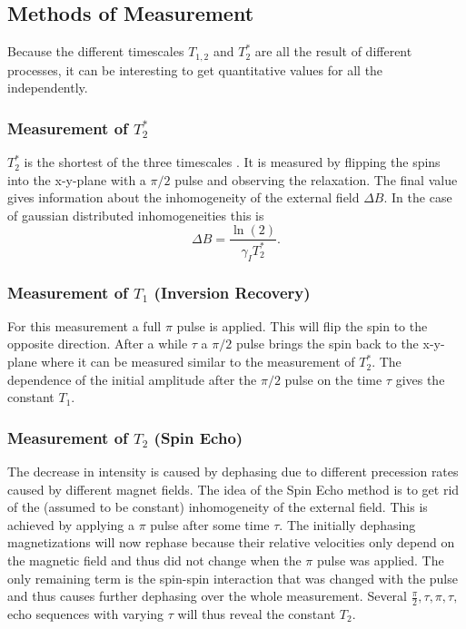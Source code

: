 \documentclass[a4paper]{scrartcl}
\numberwithin{equation}{section}
\numberwithin{figure}{section}
\numberwithin{table}{section}
\newcommand{\eq}[2]{\begin{equation}#1\label{#2}\end{equation}}
\begin{document}
\subsection{Methods of Measurement}
\label{sec:methods}
Because the different timescales $T_{1,2}$ and $T_2^*$ are all the result of different processes, it can be interesting to get quantitative values for all the independently.

\subsubsection*{Measurement of $T_2^*$}
$T_2^*$ is the shortest of the three timescales \cite{skript}. It is measured by flipping the spins into the x-y-plane with a $\pi/2$ pulse and observing the relaxation. The final value gives information about the inhomogeneity of the external field ${\Delta B}$. In the case of gaussian distributed inhomogeneities this is
\eq{{\Delta B} = \frac{\ln(2)}{\gamma_I T_2^*} .}{eq:deltaB}

\subsubsection*{Measurement of $T_1$ (Inversion Recovery)}
For this measurement a full $\pi$ pulse is applied. This will flip the spin to the opposite direction. After a while $\tau$ a $\pi/2$ pulse brings the spin back to the x-y-plane where it can be measured similar to the measurement of $T_2^*$. The dependence of the initial amplitude after the $\pi/2$ pulse on the time $\tau$ gives the constant $T_1$.

\subsubsection*{Measurement of $T_2$ (Spin Echo)}
The decrease in intensity is caused by dephasing due to different precession rates caused by different magnet fields. The idea of the Spin Echo method is to get rid of the (assumed to be constant) inhomogeneity of the external field. This is achieved by applying a $\pi$ pulse after some time $\tau$. The initially dephasing magnetizations will now rephase because their relative velocities only depend on the magnetic field and thus did not change when the $\pi$ pulse was applied. The only remaining term is the spin-spin interaction that was changed with the pulse and thus causes further dephasing over the whole measurement. Several $\frac{\pi}{2},\tau,\pi,\tau,$echo sequences with varying $\tau$ will thus reveal the constant $T_2$.
\end{document}
